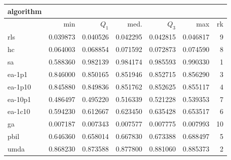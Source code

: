 \begin{tabular}{@{}l*{5}{>{{}}N{1}{3}}>{{}}N{2}{0}@{}}
\toprule
{algorithm} &  \\
\midrule
& {min} & {$Q_1$} & {med.} & {$Q_3$} & {max} & {rk}\\
\midrule
rls & 0.039873 & 0.040526 & 0.042295 & 0.042815 & 0.046817 & 9\\
hc & 0.064003 & 0.068854 & 0.071592 & 0.072873 & 0.074590 & 8\\
sa & 0.588360 & {\color{blue}} 0.982139 & {\color{blue}} 0.984174 & {\color{blue}} 0.985593 & {\color{blue}} 0.990330 & 1\\
ea-1p1 & 0.846000 & 0.850165 & 0.851946 & 0.852715 & 0.856290 & 3\\
ea-1p10 & 0.845880 & 0.849836 & 0.851762 & 0.852625 & 0.855117 & 4\\
ea-10p1 & 0.486497 & 0.495220 & 0.516339 & 0.521228 & 0.539353 & 7\\
ea-1c10 & 0.594230 & 0.612667 & 0.623450 & 0.635428 & 0.653517 & 6\\
ga & 0.007187 & 0.007343 & 0.007577 & 0.007775 & 0.007993 & 10\\
pbil & 0.646360 & 0.658014 & 0.667830 & 0.673388 & 0.688497 & 5\\
umda & {\color{blue}} 0.868230 & 0.873588 & 0.877800 & 0.881060 & 0.885373 & 2\\
\bottomrule
\end{tabular}
